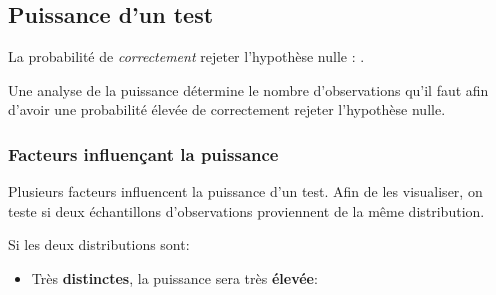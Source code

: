 \documentclass[french]{article}
\begin{document}
\begin{multicols*}{2}
\columnbreak
\subsection{Puissance d'un test}\label{subsec:PowerTests}
\begin{definitionNOHFILL}
La probabilité de \textit{correctement} rejeter l'hypothèse nulle : .

\tcbline

Une analyse de la puissance détermine le nombre d'observations qu'il faut afin d'avoir une probabilité élevée de correctement rejeter l'hypothèse nulle.
\end{definitionNOHFILL}

\subsubsection{Facteurs influençant la puissance}
Plusieurs facteurs influencent la puissance d'un test. Afin de les visualiser, on teste si deux échantillons d'observations proviennent de la même distribution. 

\begin{definitionNOHFILLsub}
Si les deux distributions sont:
\begin{itemize}
	\item	Très \textbf{distinctes}, la puissance sera très \textbf{élevée}:
		\begin{center}

\begin{tikzpicture}[x=0.75pt,y=0.75pt,yscale=-1,xscale=1]


\end{tikzpicture}
\end{center}
\end{itemize}
\end{definitionNOHFILLsub}
\end{multicols*}
\end{document}
